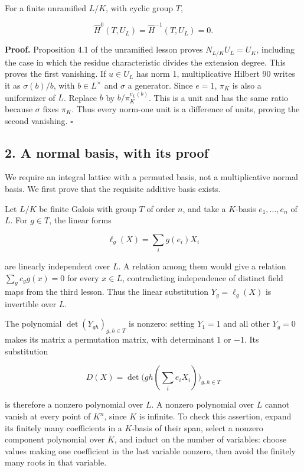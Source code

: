 \documentclass[11pt,a4paper]{article}
\begin{document}
For a finite unramified \(L/K\), with cyclic group \(T\),

\[
\widehat H^0(T,U_L)=\widehat H^{-1}(T,U_L)=0.
\tag{3}
\]

\textbf{Proof.} Proposition 4.1 of the unramified lesson proves
\(N_{L/K}U_L=U_K\), including the case in which the residue
characteristic divides the extension degree. This proves the first
vanishing. If \(u\in U_L\) has norm 1, multiplicative Hilbert 90 writes
it as \(\sigma(b)/b\), with \(b\in L^\times\) and \(\sigma\) a
generator. Since \(e=1\), \(\pi_K\) is also a uniformizer of \(L\).
Replace \(b\) by \(b/\pi_K^{v_L(b)}\). This is a unit and has the same
ratio because \(\sigma\) fixes \(\pi_K\). Thus every norm-one unit is a
difference of units, proving the second vanishing. \(\square\)

\subsection{2. A normal basis, with its
proof}\label{a-normal-basis-with-its-proof}

We require an integral lattice with a permuted basis, not a
multiplicative normal basis. We first prove that the requisite additive
basis exists.

Let \(L/K\) be finite Galois with group \(T\) of order \(n\), and take a
\(K\)-basis \(e_1,\ldots,e_n\) of \(L\). For \(g\in T\), the linear
forms

\[
\ell_g(X)=\sum_i g(e_i)X_i
\]

are linearly independent over \(L\). A relation among them would give a
relation \(\sum_g c_g g(x)=0\) for every \(x\in L\), contradicting
independence of distinct field maps from the third lesson. Thus the
linear substitution \(Y_g=\ell_g(X)\) is invertible over \(L\).

The polynomial \(\det(Y_{gh})_{g,h\in T}\) is nonzero: setting \(Y_1=1\)
and all other \(Y_g=0\) makes its matrix a permutation matrix, with
determinant \(1\) or \(-1\). Its substitution

\[
D(X)=\det\bigl(gh(\textstyle\sum_i e_iX_i)\bigr)_{g,h\in T}
\]

is therefore a nonzero polynomial over \(L\). A nonzero polynomial over
\(L\) cannot vanish at every point of \(K^n\), since \(K\) is infinite.
To check this assertion, expand its finitely many coefficients in a
\(K\)-basis of their span, select a nonzero component polynomial over
\(K\), and induct on the number of variables: choose values making one
coefficient in the last variable nonzero, then avoid the finitely many
roots in that variable.
\end{document}
